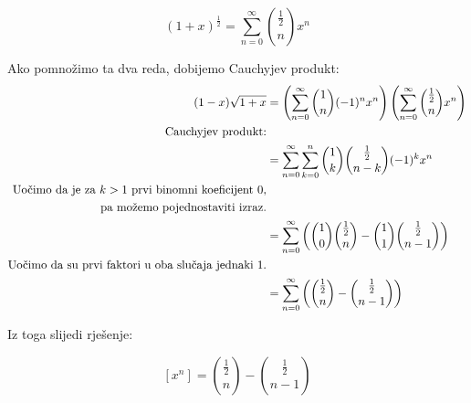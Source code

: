 \documentclass[exam.tex]{subfiles}
\begin{document}
	\[ (1 + x)^{\frac{1}{2}} = \sum\limits^\infty_{n=0} \binom{\frac{1}{2}}{n} x^n \]
	
	Ako pomnožimo ta dva reda, dobijemo Cauchyjev produkt:
	\begin{align*}
		(1 - x) \sqrt{1 + x} &= \left ( \sum\limits^\infty_{n=0} \binom{1}{n} (-1)^n x^n \right ) \left ( \sum\limits^\infty_{n=0} \binom{\frac{1}{2}}{n} x^n \right ) \\
		\text{Cauchyjev produkt:} \\
		&= \sum\limits^\infty_{n=0} \sum\limits^n_{k=0} \binom{1}{k} \binom{\frac{1}{2}}{n - k} (-1)^k x^n \\
		\text{Uočimo da je za \( k > 1 \) prvi binomni koeficijent \( 0 \),} \\
		\text{ pa možemo pojednostaviti izraz.} \\
		&= \sum\limits^\infty_{n=0} \left ( \binom{1}{0} \binom{\frac{1}{2}}{n} - \binom{1}{1} \binom{\frac{1}{2}}{n - 1} \right ) \\
		\text{Uočimo da su prvi faktori u oba slučaja jednaki \( 1 \).} \\
		&= \sum\limits^\infty_{n=0} \left ( \binom{\frac{1}{2}}{n} - \binom{\frac{1}{2}}{n - 1} \right ) \\
	\end{align*}
	
	Iz toga slijedi rješenje:
	
	\[ [x^n] = \binom{\frac{1}{2}}{n} - \binom{\frac{1}{2}}{n - 1} \]
\end{document}
